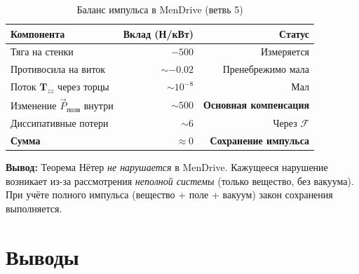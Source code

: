 \documentclass[a4paper,12pt]{article}
\begin{document}
\begin{table}[h]
\centering
\caption{Баланс импульса в MenDrive (ветвь 5)}
\label{tab:momentum_balance}
\begin{tabular}{@{}lrr@{}}
\toprule
\textbf{Компонента} & \textbf{Вклад (Н/кВт)} & \textbf{Статус} \\
\midrule
Тяга на стенки & $-500$ & Измеряется \\
Противосила на виток & $\sim -0.02$ & Пренебрежимо мала \\
Поток $\mathbf{T}_{zz}$ через торцы & $\sim 10^{-8}$ & Мал \\
Изменение $\vec{P}_{\text{поля}}$ внутри & $\sim 500$ & \textbf{Основная компенсация} \\
Диссипативные потери & $\sim 6$ & Через $\mathcal{F}$ \\
\midrule
\textbf{Сумма} & $\approx 0$ & \textbf{Сохранение импульса} \\
\bottomrule
\end{tabular}
\end{table}

\textbf{Вывод:} Теорема Нётер \textit{не нарушается} в MenDrive.
Кажущееся нарушение возникает из-за рассмотрения \textit{неполной
системы} (только вещество, без вакуума). При учёте полного импульса
(вещество + поле + вакуум) закон сохранения выполняется.

\section{Выводы}
\end{document}
